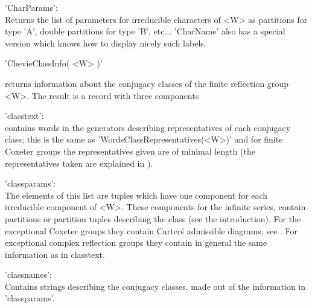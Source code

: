 'CharParams':\\ Returns the list of parameters for irreducible characters
     of <W> as partitions for type  'A', double partitions for type 'B',
     etc... 'CharName'  also has  a special version  which knows  how to
     display nicely such labels.


'ChevieClassInfo( <W> )'

returns information about the conjugacy classes of the finite reflection
group <W>. The  result is a record with  three components\:\

'classtext':\\   contains    words   in   the    generators   describing
     representatives   of  each  conjugacy  class;  this  is  the  same  as
     'WordsClassRepresentatives(<W>)'  and  for  finite  Coxeter groups the
     representatives given are of minimal length (the representatives taken
     are explained in \cite{GM97}).

'classparams':\\   The elements of this list are tuples which have one
     component for  each irreducible component of  <W>. These components
     for  the infinite  series, contain  partitions or  partition tuples
     describing the  class (see  the introduction). For  the exceptional
     Coxeter  groups they  contain  Carter\'s  admissible diagrams,  see
     \cite{Car72}.  For  exceptional   complex  reflection  groups  they
     contain in general the same information as in classtext.

'classnames':\\ Contains strings describing  the conjugacy classes, made
     out of the information in 'classparams'.


